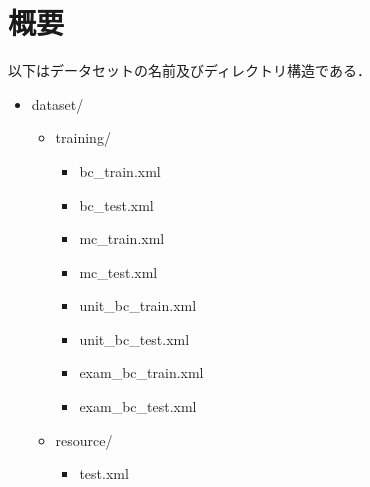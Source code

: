 \section*{概要}

以下はデータセットの名前及びディレクトリ構造である．

\begin{itemize}
\item dataset/
  \begin{itemize}
  \item training/
    \begin{itemize}
      \item bc\_train.xml
      \item bc\_test.xml
      \item mc\_train.xml
      \item mc\_test.xml
      \item unit\_bc\_train.xml
      \item unit\_bc\_test.xml
      \item exam\_bc\_train.xml
      \item exam\_bc\_test.xml
    \end{itemize} 
  \item resource/
    \begin{itemize}
      \item test.xml
    \end{itemize}
  \end{itemize}
\end{itemize}
